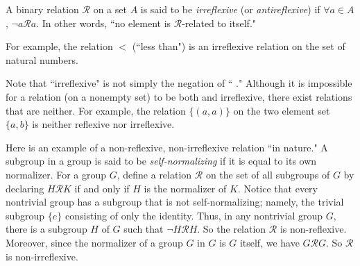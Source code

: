 \documentclass[12pt]{article}
\begin{document}
A binary relation $\mathcal{R}$ on a set $A$ is said to be \emph{irreflexive} (or \emph{antireflexive}) if $\forall a\in A$, $\neg a\mathcal{R} a$. In other words, ``no element is $\mathcal{R}$-related to itself."

For example, the relation $<$ (``less than") is an irreflexive relation on the set of natural numbers.

Note that ``irreflexive" is not simply the negation of ``
." Although it is impossible for a relation (on a nonempty set) to be both 
 and irreflexive, there exist relations that are neither. For example, the relation $\{(a,a)\}$ on the two element set $\{a,b\}$ is neither reflexive nor irreflexive. 

Here is an example of a non-reflexive, non-irreflexive relation ``in nature." A subgroup in a group is said to be \emph{self-normalizing} if it is equal to its own normalizer. For a group $G$, define a relation $\mathcal{R}$ on the set of all subgroups of $G$ by declaring $H\mathcal{R}K$ if and only if $H$ is the normalizer of $K$. Notice that every nontrivial group has a subgroup that is not self-normalizing; namely, the trivial subgroup $\{e\}$ consisting of only the identity. Thus, in any nontrivial group $G$, there is a subgroup $H$ of $G$ such that $\neg H\mathcal{R} H$. So the relation $\mathcal{R}$ is non-reflexive. Moreover, since the normalizer of a group $G$ in $G$ is $G$ itself, we have $G\mathcal{R} G$. So $\mathcal{R}$ is non-irreflexive.
\end{document}
